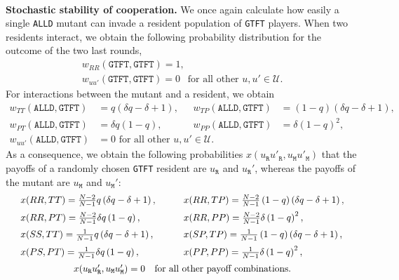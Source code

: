 \documentclass[11pt]{article}
\def\alld{\texttt{ALLD}}
\def\gtft{\texttt{GTFT}}
\def\resident{\texttt{R}}
\def\mutant{\texttt{M}}
\theoremstyle{plainCl1}
\theoremstyle{plainCl2}
\begin{document}
 
 ~\\
 \noindent
 {\bf Stochastic stability of cooperation.}
We once again calculate how easily a single \alld{} mutant can invade a
resident population of \gtft{} players. When two residents interact,
we obtain the following probability distribution for the outcome of the two last rounds, 
\begin{equation*}
\begin{array}{ll}
    w_{RR}(\gtft,\gtft) =  1,\\
    w_{uu'}(\gtft, \gtft) =   0~~ \text{ for all other } u,u'\in \mathcal{U}.
\end{array}
\end{equation*}
For interactions between the mutant and a resident, we obtain
\begin{align*}
    w_{TT} (\alld,\gtft) & = q \left(\delta q - \delta + 1\right), & 
    w_{TP}(\alld,\gtft) & =  \left(1 - q\right) \left(\delta q - \delta + 1\right), \\
    w_{PT} (\alld,\gtft) & = \delta q \left(1 - q\right), & 
    w_{PP} (\alld,\gtft) & = \delta \left(1-q\right)^{2},\\
    w_{uu'}(\alld,\gtft) & =  0 \text{ for all other } u,u' \in \mathcal{U}.
\end{align*}
As a consequence, we obtain the following probabilities  $x(u_\resident u'_\resident, u_\mutant u'_\mutant)$ that the
payoffs of a randomly chosen \gtft{} resident are $u_\resident$ and $u_\resident'$, whereas the payoffs of the mutant are $u_\mutant$ and $u_\mutant'$:
\begin{equation*}
  \setlength{\arraycolsep}{15pt}
\begin{array}{ll}
  x(RR, TT) =  \frac{N-2}{N - 1}  q \left(\delta q - \delta + 1\right) ,
  &x(RR, TP) =  \frac{N-2}{N - 1} \left(1-q\right) \left(\delta q - \delta + 1\right) ,\\[0.2cm]
  x(RR, PT) =  \frac{N-2}{N - 1} \delta q  \left(1-q\right) ,
  &x(RR, PP) =  \frac{N-2}{N - 1} \delta  \left(1 - q\right)^{2} ,\\[0.2cm]
  x(SS, TT) =  \frac{1}{N -1} q \left(\delta q - \delta + 1\right) ,
  &x(SP, TP) =  \frac{1}{N -1} \left(1-q\right) \left(\delta q - \delta + 1\right) , \\[0.2cm]
  x(PS,PT) =   \frac{1}{N -1}\delta q \left(1-q\right) ,
  &x(PP, PP) =  \frac{1}{N -1}\delta \left(1-q\right)^{2} ,\\[0.2cm]
  \multicolumn{2}{c}{x(u_\resident u'_\resident, u_\mutant u'_\mutant) =  0~~ \text{ for all other payoff combinations.}}
\end{array}
\end{equation*}
\end{document}
